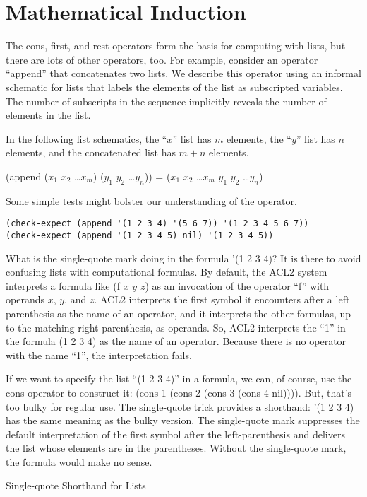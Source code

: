 \section{Mathematical Induction}
\label{sec:induction}
The cons, first, and rest operators form the basis for computing with lists, 
but there are lots of other operators, too. 
For example, consider an operator ``append'' that concatenates two lists. 
We describe this operator using an informal schematic for lists 
that labels the elements of the list as subscripted variables. 
The number of subscripts in the sequence implicitly reveals the number of elements in the list.

\label{list-schematic} In the following list schematics, the ``$x$'' list has $m$ elements, the ``$y$'' list has $n$ elements, and the concatenated list has $m+n$ elements.
\begin{center}
(append ($x_1$ $x_2$ \dots $x_m$) ($y_1$ $y_2$ \dots $y_n$)) = ($x_1$ $x_2$ \dots $x_m$ $y_1$ $y_2$ \dots $y_n$)
\end{center}

Some simple tests might bolster our understanding of the operator.

\begin{lstlisting}
(check-expect (append '(1 2 3 4) '(5 6 7)) '(1 2 3 4 5 6 7))
(check-expect (append '(1 2 3 4 5) nil) '(1 2 3 4 5))
\end{lstlisting}

\begin{aside}
What is the single-quote mark doing in the formula '(1 2 3 4)? 
It is there to avoid confusing lists with computational formulas. 
By default, the ACL2 system interprets a formula like 
(f $x$ $y$ $z$) as an invocation of the operator ``f'' with operands $x$, $y$, and $z$. 
ACL2 interprets the first symbol it encounters after a left parenthesis 
as the name of an operator, and it interprets the other formulas, 
up to the matching right parenthesis, as operands.
So, ACL2 interprets the ``1'' in the formula (1 2 3 4) as the name of an operator.
Because there is no operator with the name ``1'', the interpretation fails.

If we want to specify the list ``(1 2 3 4)'' in a formula, 
we can, of course, use the cons operator to construct it: 
(cons 1 (cons 2 (cons 3 (cons 4 nil)))). 
But, that's too bulky for regular use. 
The single-quote trick provides a shorthand: 
'(1 2 3 4) has the same meaning as the bulky version.
The single-quote mark suppresses the default interpretation 
of the first symbol after the left-parenthesis and 
delivers the list whose elements are in the parentheses. 
Without the single-quote mark,  
the formula would make no sense.
\caption{Single-quote Shorthand for Lists}
\label{quote}
\end{aside}

